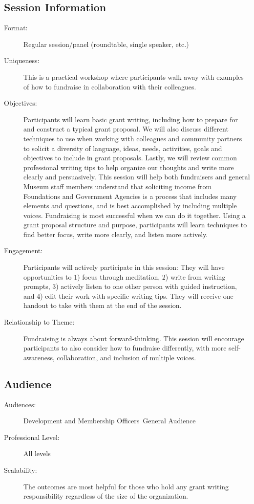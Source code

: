 \documentclass{report}
\begin{document}
              \subsection*{Session Information}
                \begin{description}
                  \item [Format:] Regular session/panel (roundtable, single speaker, etc.)
							    
							    \item [Uniqueness:]This is a practical workshop where participants walk away with examples of how to fundraise in collaboration with their colleagues.
							    \item [Objectives:]Participants will learn basic grant writing, including how to prepare for and construct a typical grant proposal. We will also discuss different techniques to use when working with colleagues and community partners to solicit a diversity of language, ideas, needs, activities, goals and objectives to include in grant proposals. Lastly, we will review common professional writing tips to help organize our thoughts and write more clearly and persuasively. This session will help both fundraisers and general Museum staff members understand that soliciting income from Foundations and Government Agencies is a process that includes many elements and questions, and is best accomplished by including multiple voices. Fundraising is most successful when we can do it together. Using a grant proposal structure and purpose, participants will learn techniques to find better focus, write more clearly, and listen more actively.
							    \item [Engagement:]Participants will actively participate in this session: They will have opportunities to 1) focus through meditation, 2) write from writing prompts, 3) actively listen to one other person with guided instruction, and 4) edit their work with specific writing tips. They will receive one handout to take with them at the end of the session.
							    \item [Relationship to Theme:]Fundraising is always about forward-thinking. This session will encourage participants to also consider how to fundraise differently, with more self-awareness, collaboration, and inclusion of multiple voices.
							    
                \end{description}
              \subsection*{Audience}
                \begin{description}
                  \item [Audiences:]Development and Membership Officers~General Audience~
                  \item[Professional Level:]All levels~
                \item[Scalability:] The outcomes are most helpful for those who hold any grant writing responsibility regardless of the size of the organization. 

							
              \end{description}
\end{document}
